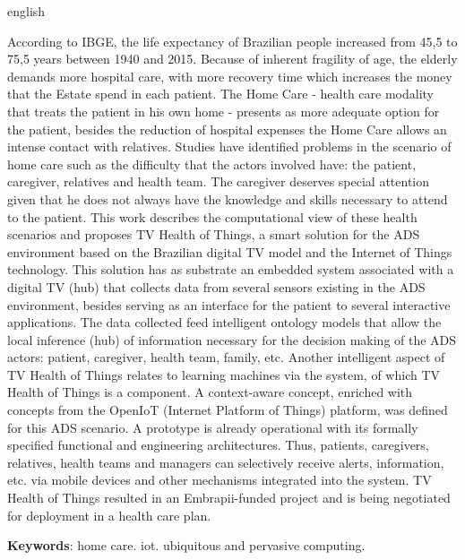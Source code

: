 \begin{resumo}[Abstract]
 \begin{otherlanguage*}{english}

According to IBGE, the life expectancy of Brazilian people increased from 45,5
to 75,5 years between 1940 and 2015. Because of inherent fragility of age, the
elderly demands more hospital care, with more recovery time which increases the
money that the Estate spend in each patient. The Home Care - health care
modality that treats the patient in his own home - presents as more adequate
option for the patient, besides the reduction of hospital expenses the Home
Care allows an intense contact with relatives. Studies have identified problems
in the scenario of home care such as the difficulty that the actors involved
have: the patient, caregiver, relatives and health team. The caregiver deserves
special attention given that he does not always have the knowledge and skills
necessary to attend to the patient. This work describes the computational view
of these health scenarios and proposes TV Health of Things, a smart solution
for the ADS environment based on the Brazilian digital TV model and the
Internet of Things technology.  This solution has as substrate an embedded
system associated with a digital TV (hub) that collects data from several
sensors existing in the ADS environment, besides serving as an interface for
the patient to several interactive applications.  The data collected feed
intelligent ontology models that allow the local inference (hub) of information
necessary for the decision making of the ADS actors: patient, caregiver, health
team, family, etc.  Another intelligent aspect of TV Health of Things relates
to learning machines via the \nextsaude[] system, of which TV Health of Things
is a component.  A context-aware concept, enriched with concepts from the
OpenIoT (Internet Platform of Things) platform, was defined for this ADS
scenario.  A prototype is already operational with its formally specified
functional and engineering architectures.  Thus, patients, caregivers,
relatives, health teams and managers can selectively receive alerts,
information, etc. via mobile devices and other mechanisms integrated into the
system.  TV Health of Things resulted in an Embrapii-funded project and is
being negotiated for deployment in a health care plan.



\textbf{Keywords}: home care. iot. ubiquitous and pervasive computing.
 \end{otherlanguage*}
\end{resumo}
